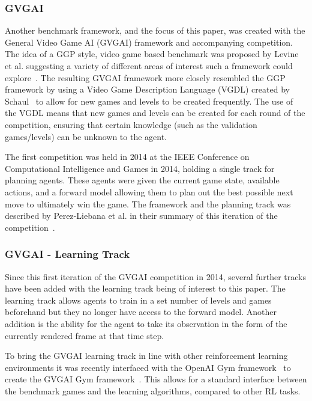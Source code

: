 \subsubsection{GVGAI}
Another benchmark framework, and the focus of this paper, was created with the General Video Game AI (GVGAI) framework and accompanying competition.
The idea of a GGP style, video game based benchmark was proposed by Levine et al. suggesting a variety of different areas of interest such a framework could explore~\cite{GVGP}.
The resulting GVGAI framework more closely resembled the GGP framework by using a Video Game Description Language (VGDL) created by Schaul~\cite{VGDL} to allow for new games and levels to be created frequently.
The use of the VGDL means that new games and levels can be created for each round of the competition, ensuring that certain knowledge (such as the validation games/levels) can be unknown to the agent.
\par
The first competition was held in 2014 at the IEEE Conference on Computational Intelligence and Games in 2014, holding a single track for planning agents.
These agents were given the current game state, available actions, and a forward model allowing them to plan out the best possible next move to ultimately win the game.
The framework and the planning track was described by Perez-Liebana et al. in their summary of this iteration of the competition~\cite{GVGAI14}.

\subsubsection{GVGAI - Learning Track}
Since this first iteration of the GVGAI competition in 2014, several further tracks have been added with the learning track being of interest to this paper.
The learning track allows agents to train in a set number of levels and games beforehand but they no longer have access to the forward model.
Another addition is the ability for the agent to take its observation in the form of the currently rendered frame at that time step.
\par
To bring the GVGAI learning track in line with other reinforcement learning environments it was recently interfaced with the OpenAI Gym framework~\cite{OpenAIGym} to create the GVGAI Gym framework~\cite{GVGAIGym}.
This allows for a standard interface between the benchmark games and the learning algorithms, compared to other RL tasks.
